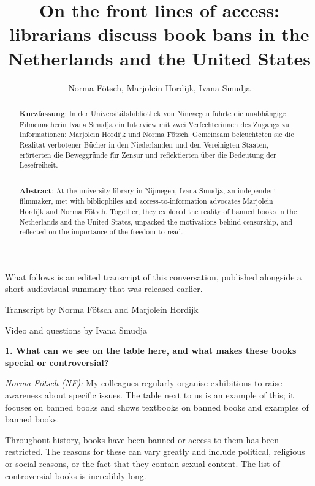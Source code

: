 \documentclass[a4paper,
fontsize=11pt,
oneside,
numbers=noperiodatend,
parskip=half-,
bibliography=totoc,
final
]{scrartcl}
\title{\LARGE{On the front lines of access: librarians discuss book bans in the Netherlands and the United States}}%
\author{Norma Fötsch, Marjolein Hordijk, Ivana Smudja} %
\date{}
\begin{document}
\maketitle
\thispagestyle{fancyplain} 

\begin{abstract}
\noindent
\textbf{Kurzfassung}: In der Universitätsbibliothek von Nimwegen führte
die unabhängige Filmemacherin Ivana Smudja ein Interview mit zwei
Verfechterinnen des Zugangs zu Informationen: Marjolein Hordijk und
Norma Fötsch. Gemeinsam beleuchteten sie die Realität verbotener Bücher
in den Niederlanden und den Vereinigten Staaten, erörterten die
Beweggründe für Zensur und reflektierten über die Bedeutung der
Lesefreiheit.

\begin{center}\rule{0.5\linewidth}{0.5pt}\end{center}

\noindent\textbf{Abstract}: At the university library in Nijmegen, Ivana Smudja,
an independent film\-maker, met with bibliophiles and
access-to-information advocates Marjolein Hordijk and Norma Fötsch.
Together, they explored the reality of banned books in the Netherlands
and the United States, unpacked the motivations behind censorship, and
reflected on the importance of the freedom to read.
\end{abstract}

\vspace{0.5cm}
What follows is an edited transcript of this conversation, published
alongside a short
\href{https://www.voxweb.nl/nieuws/waarom-worden-boeken-verboden-en-kan-dit-ook-in-nederland-gebeuren}{audiovisual
summary} that was released earlier.

Transcript by Norma Fötsch and Marjolein Hordijk

Video and questions by Ivana Smudja

\textbf{1. What can we see on the table here, and what makes these books
special or controversial?}

\emph{Norma Fötsch (NF):} My colleagues regularly organise exhibitions
to raise awareness about specific issues. The table next to us is an
example of this; it focuses on banned books and shows textbooks on
banned books and examples of banned books.

Throughout history, books have been banned or access to them has been
restricted. The reasons for these can vary greatly and include
political, religious or social reasons, or the fact that they contain
sexual content. The list of controversial books is incredibly long.
\end{document}
